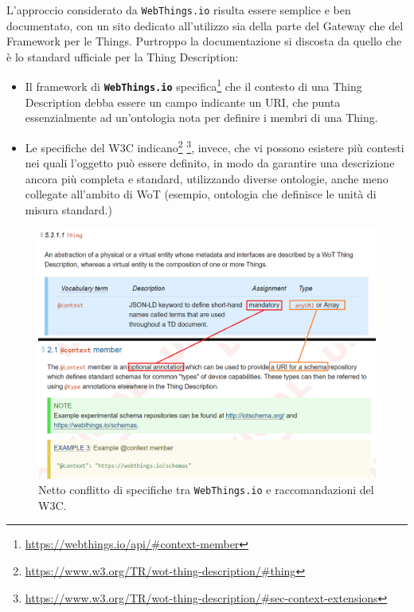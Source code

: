 \documentclass[12pt,a4paper,openright,oneside]{report}
\begin{document}
L'approccio considerato da \texttt{WebThings.io} risulta essere semplice e ben documentato, con un sito dedicato all'utilizzo sia della parte del Gateway che del Framework per le Things. Purtroppo la documentazione si discosta da quello che è lo standard ufficiale per la Thing Description:

\begin{itemize}
	\item Il framework di \textbf{\texttt{WebThings.io}} specifica\footnote{\url{https://webthings.io/api/\#context-member}} che il contesto di una Thing Description debba essere un campo indicante un URI, che punta essenzialmente ad un'ontologia nota per definire i membri di una Thing.
	
	\item Le specifiche del W3C indicano\footnote{\url{https://www.w3.org/TR/wot-thing-description/\#thing}} \footnote{\url{https://www.w3.org/TR/wot-thing-description/\#sec-context-extensions}}, invece, che vi possono esistere più contesti nei quali l'oggetto può essere definito, in modo da garantire una descrizione ancora più completa e standard, utilizzando diverse ontologie, anche meno collegate all'ambito di WoT (esempio, ontologia che definisce le unità di misura standard.)
\end{itemize}

\begin{figure}[h]
	\centering
	\includegraphics[scale=0.55]{eps/specification-conflict.png}
	\caption{Netto conflitto di specifiche tra \texttt{WebThings.io} e raccomandazioni del W3C.}
	\label{fig:specification-conflict}
\end{figure}
\end{document}
